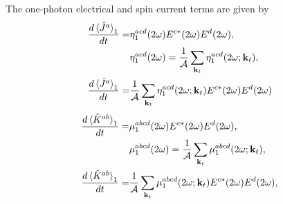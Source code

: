 \documentclass{article}
\newcommand{\kt}{\mathbf{k}_{t}}
\begin{document}
The one-photon electrical and spin current terms are given by
\begin{align}
\frac{d\ev*{\hat{J}^{a}}_{1}}{dt} =& \eta^{acd}_{1}(2\omega) E^{c*}(2\omega)
E^{d}(2\omega), \nonumber \\ 
& \eta^{acd}_{1}(2\omega) = \frac{1}{\mathcal{A}} \sum_{\kt} \eta^{acd}_{1}
(2\omega;\kt), \nonumber \\
\frac{d\ev*{\hat{J}^{a}}_{1}}{dt} =& \frac{1}{\mathcal{A}} \sum_{\kt} 
\eta^{acd}_{1} (2\omega;\kt) E^{c*}(2\omega) E^{d}(2\omega) \label{eq:J_1-2w}
\end{align}
\begin{align}
\frac{d\ev*{\hat{K}^{ab}}_{1}}{dt} =& \mu^{abcd}_{1}(2\omega)
E^{c*}(2\omega) E^{d}(2\omega), \nonumber \\ 
& \mu^{abcd}_{1}(2\omega) = \frac{1}{\mathcal{A}} \sum_{\kt} \mu^{abcd}_{1}
(2\omega;\kt) , \nonumber \\
\frac{d\ev*{\hat{K}^{ab}}_{1}}{dt} =& \frac{1}{\mathcal{A}} \sum_{\kt} 
\mu^{abcd}_{1}(2\omega;\kt) E^{c*}(2\omega) E^{d}(2\omega), \label{eq:mu_1-2w}
\end{align}
\end{document}
